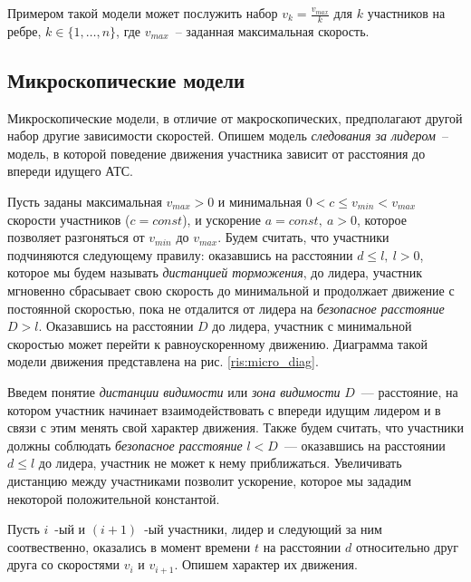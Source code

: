 \documentclass[12pt, a4paper]{article}
\begin{document}
	
	Примером такой модели может послужить набор $v_k = \frac{v_{max}}{k}$ для $k$ участников на ребре, $k \in \{1, \dots, n\}$, где $v_{max}$~-- заданная максимальная скорость. 
	
	\subsection{Микроскопические модели}
	
	Микроскопические модели, в отличие от макроскопических, предполагают другой набор другие зависимости скоростей.
	Опишем модель \textit{следования за лидером}~-- модель, в которой поведение движения участника зависит от расстояния до впереди идущего АТС. 
	
	Пусть заданы максимальная $v_{max} > 0$ и минимальная $0 < c \le v_{min} < v_{max}$ скорости участников ($c = const$), и ускорение $a = const, \: a > 0$, которое позволяет разгоняться от $v_{min}$ до $v_{max}$. Будем считать, что участники подчиняются следующему правилу:
	оказавшись на расстоянии $d \leq l, \: l > 0$, которое мы будем называть \textit{дистанцией торможения}, до лидера, участник
	мгновенно сбрасывает свою скорость до минимальной и продолжает движение с постоянной скоростью, пока не отдалится от лидера на \textit{безопасное расстояние} $D > l$. Оказавшись на расстоянии $D$ до лидера, участник с минимальной скоростью может перейти к равноускоренному движению. Диаграмма такой модели движения представлена на рис. \ref{ris:micro_diag}.
	
	Введем понятие \textit{дистанции видимости} или \textit{зона видимости} $D$~--- расстояние, на котором участник начинает взаимодействовать с впереди идущим лидером и в связи с этим менять свой характер движения. Также будем считать, что участники должны соблюдать \textit{безопасное расстояние} $l < D$~--- оказавшись на расстоянии $d \leq l$ до лидера, участник не может к нему приближаться. Увеличивать дистанцию между участниками позволит ускорение, которое мы зададим некоторой положительной константой.
	
	
	Пусть $i$~-ый и $(i+1)$~-ый участники, лидер и следующий за ним соотвественно, оказались в момент времени $t$ на расстоянии $d$ относительно друг друга со скоростями $v_i$ и $v_{i+1}$. Опишем характер их движения.
	
\end{document}

